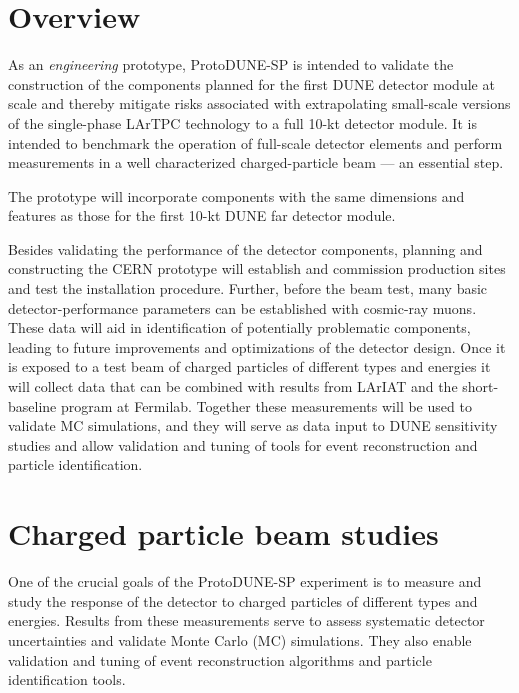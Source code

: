 
\section{Overview}

As an \textit{engineering} prototype, ProtoDUNE-SP is
intended to validate the construction of the components planned for the
first DUNE  detector module at scale and thereby mitigate
risks associated with extrapolating small-scale versions of the
single-phase LArTPC technology to a full 10-kt detector module.  It is
intended to benchmark the operation of full-scale detector
elements and perform measurements in a well characterized
charged-particle beam --- an essential step.

The prototype will incorporate components with the same
dimensions and features as those for the first 10-kt DUNE far detector
module.

Besides validating the performance of the detector components,
planning and constructing the CERN prototype will establish and
commission production sites and test the installation procedure.
Further, before the beam test, many basic detector-performance
parameters can be established with cosmic-ray muons.  These data will
aid in identification of potentially problematic components, leading
to future improvements and optimizations of the detector design.  Once
it is exposed to a test beam of charged particles of different types
and energies it will collect data that can be combined with results
from LArIAT and the short-baseline program at Fermilab.  Together
these measurements will be used to validate MC simulations, and they
will serve as data input to DUNE sensitivity studies and allow
validation and tuning of tools for event reconstruction and particle
identification.

\section{Charged particle beam studies}

One of the crucial goals of the ProtoDUNE-SP experiment is to measure and study the response of the detector to charged
particles of different types and energies. Results from these measurements serve to
assess systematic detector uncertainties and validate Monte Carlo (MC) simulations. They also enable
validation and tuning of event reconstruction algorithms and particle identification tools.

